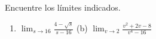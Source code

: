 \item Encuentre los límites indicados.
\begin{enumerate}
    \item[(a)] $\displaystyle \lim_{s \to 16} \frac{4 - \sqrt{s}}{s - 16}$ \quad (b) $\displaystyle \lim_{v \to 2} \frac{v^2+2v-8}{v^4-16}$
\end{enumerate}
